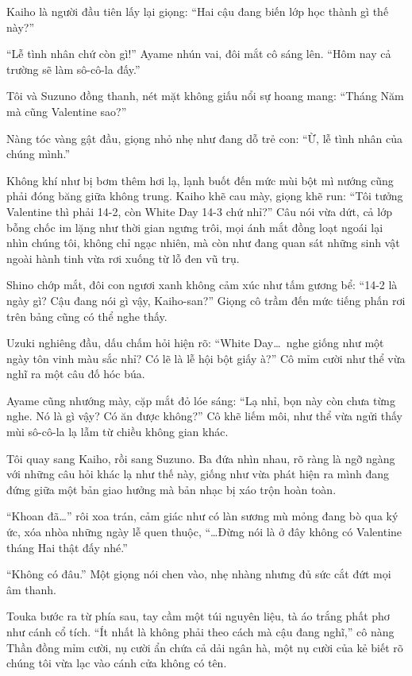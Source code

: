 \documentclass[../main.tex]{subfiles}
\begin{document}
Kaiho là người đầu tiên lấy lại giọng: ``Hai cậu đang biến lớp học thành gì thế này?''

``Lễ tình nhân chứ còn gì!'' Ayame nhún vai, đôi mắt cô sáng lên. ``Hôm nay cả trường sẽ làm sô-cô-la đấy.''

Tôi và Suzuno đồng thanh, nét mặt không giấu nổi sự hoang mang: ``Tháng Năm mà cũng Valentine sao?''

Nàng tóc vàng gật đầu, giọng nhỏ nhẹ như đang dỗ trẻ con: ``Ừ, lễ tình nhân của chúng mình.''

Không khí như bị bơm thêm hơi lạ, lạnh buốt đến mức mùi bột mì nướng cũng phải đóng băng giữa không trung. Kaiho khẽ cau mày, giọng khẽ run: ``Tôi tưởng Valentine thì phải 14-2, còn White Day 14-3 chứ nhỉ?'' Câu nói vừa dứt, cả lớp bỗng chốc im lặng như thời gian ngưng trôi, mọi ánh mắt đồng loạt ngoái lại nhìn chúng tôi, không chỉ ngạc nhiên, mà còn như đang quan sát những sinh vật ngoài hành tinh vừa rơi xuống từ lỗ đen vũ trụ.

Shino chớp mắt, đôi con ngươi xanh không cảm xúc như tấm gương bể: ``14-2 là ngày gì? Cậu đang nói gì vậy, Kaiho-san?'' Giọng cô trầm đến mức tiếng phấn rơi trên bảng cũng có thể nghe thấy.

Uzuki nghiêng đầu, dấu chấm hỏi hiện rõ: ``White Day\dots\ nghe giống như một ngày tôn vinh màu sắc nhỉ? Có lẽ là lễ hội bột giấy à?'' Cô mỉm cười như thể vừa nghĩ ra một câu đố hóc búa.

Ayame cũng nhướng mày, cặp mắt đỏ lóe sáng: ``Lạ nhỉ, bọn này còn chưa từng nghe. Nó là gì vậy? Có ăn được không?'' Cô khẽ liếm môi, như thể vừa ngửi thấy mùi sô-cô-la lạ lẫm từ chiều không gian khác.

Tôi quay sang Kaiho, rồi sang Suzuno. Ba đứa nhìn nhau, rõ ràng là ngỡ ngàng với những câu hỏi khác lạ như thế này, giống như vừa phát hiện ra mình đang đứng giữa một bản giao hưởng mà bản nhạc bị xáo trộn hoàn toàn.

``Khoan đã\dots'' rôi xoa trán, cảm giác như có làn sương mù mỏng đang bò qua ký ức, xóa nhòa những ngày lễ quen thuộc, ``\dots Đừng nói là ở đây không có Valentine tháng Hai thật đấy nhé.''

``Không có đâu.'' Một giọng nói chen vào, nhẹ nhàng nhưng đủ sức cắt đứt mọi âm thanh.

Touka bước ra từ phía sau, tay cầm một túi nguyên liệu, tà áo trắng phất phơ như cánh cổ tích. ``Ít nhất là không phải theo cách mà cậu đang nghĩ,'' cô nàng Thần đồng mỉm cười, nụ cười ẩn chứa cả dải ngân hà, một nụ cười của kẻ biết rõ chúng tôi vừa lạc vào cánh cửa không có tên.
\end{document}
